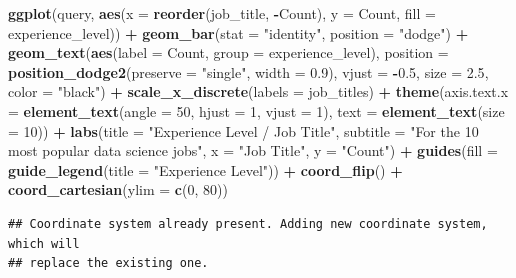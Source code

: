 \documentclass[
]{article}
\newenvironment{Shaded}{\begin{snugshade}}{\end{snugshade}}
\newcommand{\AttributeTok}[1]{\textcolor[rgb]{0.13,0.29,0.53}{#1}}
\newcommand{\DecValTok}[1]{\textcolor[rgb]{0.00,0.00,0.81}{#1}}
\newcommand{\FloatTok}[1]{\textcolor[rgb]{0.00,0.00,0.81}{#1}}
\newcommand{\FunctionTok}[1]{\textcolor[rgb]{0.13,0.29,0.53}{\textbf{#1}}}
\newcommand{\NormalTok}[1]{#1}
\newcommand{\SpecialCharTok}[1]{\textcolor[rgb]{0.81,0.36,0.00}{\textbf{#1}}}
\newcommand{\StringTok}[1]{\textcolor[rgb]{0.31,0.60,0.02}{#1}}
\begin{document}
\begin{Shaded}
\begin{Highlighting}[]
\FunctionTok{ggplot}\NormalTok{(query, }\FunctionTok{aes}\NormalTok{(}\AttributeTok{x =} \FunctionTok{reorder}\NormalTok{(job\_title, }\SpecialCharTok{{-}}\NormalTok{Count), }\AttributeTok{y =}\NormalTok{ Count, }\AttributeTok{fill =}\NormalTok{ experience\_level)) }\SpecialCharTok{+}
  \FunctionTok{geom\_bar}\NormalTok{(}\AttributeTok{stat =} \StringTok{"identity"}\NormalTok{, }\AttributeTok{position =} \StringTok{"dodge"}\NormalTok{) }\SpecialCharTok{+}
  \FunctionTok{geom\_text}\NormalTok{(}\FunctionTok{aes}\NormalTok{(}\AttributeTok{label =}\NormalTok{ Count, }\AttributeTok{group =}\NormalTok{ experience\_level), }\AttributeTok{position =} \FunctionTok{position\_dodge2}\NormalTok{(}\AttributeTok{preserve =} \StringTok{"single"}\NormalTok{, }\AttributeTok{width =} \FloatTok{0.9}\NormalTok{), }\AttributeTok{vjust =} \SpecialCharTok{{-}}\FloatTok{0.5}\NormalTok{, }\AttributeTok{size =} \FloatTok{2.5}\NormalTok{, }\AttributeTok{color =} \StringTok{"black"}\NormalTok{) }\SpecialCharTok{+}
  \FunctionTok{scale\_x\_discrete}\NormalTok{(}\AttributeTok{labels =}\NormalTok{ job\_titles) }\SpecialCharTok{+}
  \FunctionTok{theme}\NormalTok{(}\AttributeTok{axis.text.x =} \FunctionTok{element\_text}\NormalTok{(}\AttributeTok{angle =} \DecValTok{50}\NormalTok{, }\AttributeTok{hjust =} \DecValTok{1}\NormalTok{, }\AttributeTok{vjust =} \DecValTok{1}\NormalTok{), }\AttributeTok{text =} \FunctionTok{element\_text}\NormalTok{(}\AttributeTok{size =} \DecValTok{10}\NormalTok{)) }\SpecialCharTok{+}
  \FunctionTok{labs}\NormalTok{(}\AttributeTok{title =} \StringTok{"Experience Level / Job Title"}\NormalTok{, }\AttributeTok{subtitle =} \StringTok{"For the 10 most popular data science jobs"}\NormalTok{, }\AttributeTok{x =} \StringTok{"Job Title"}\NormalTok{, }\AttributeTok{y =} \StringTok{"Count"}\NormalTok{) }\SpecialCharTok{+}
  \FunctionTok{guides}\NormalTok{(}\AttributeTok{fill =} \FunctionTok{guide\_legend}\NormalTok{(}\AttributeTok{title =} \StringTok{"Experience Level"}\NormalTok{)) }\SpecialCharTok{+}
  \FunctionTok{coord\_flip}\NormalTok{() }\SpecialCharTok{+}
  \FunctionTok{coord\_cartesian}\NormalTok{(}\AttributeTok{ylim =} \FunctionTok{c}\NormalTok{(}\DecValTok{0}\NormalTok{, }\DecValTok{80}\NormalTok{))}
\end{Highlighting}
\end{Shaded}

\begin{verbatim}
## Coordinate system already present. Adding new coordinate system, which will
## replace the existing one.
\end{verbatim}
\end{document}

